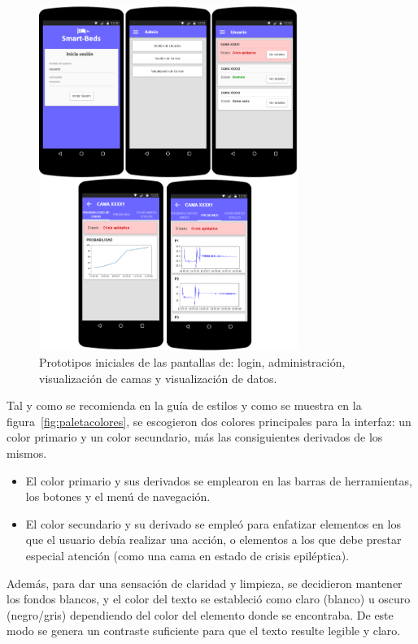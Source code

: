 \begin{figure}[H]
	\centering
	\includegraphics[width=0.75\textwidth]{../img/prototipos.png}
	\caption{Prototipos iniciales de las pantallas de: login, administración, visualización de camas y visualización de datos.}
	\label{fig:prototipos}
\end{figure}

Tal y como se recomienda en la guía de estilos y como se muestra en la figura~\ref{fig:paletacolores}, se escogieron dos colores principales para la interfaz: un color primario y un color secundario, más las consiguientes derivados de los mismos. 
\begin{itemize}
	\item El color primario y sus derivados se emplearon en las barras de herramientas, los botones y el menú de navegación. 
	\item El color secundario y su derivado se empleó para enfatizar elementos en los que el usuario debía realizar una acción, o elementos a los que debe prestar especial atención (como una cama en estado de crisis epiléptica). 
\end{itemize}

Además, para dar una sensación de claridad y limpieza, se decidieron mantener los fondos blancos, y el color del texto se estableció como claro (blanco) u oscuro (negro/gris) dependiendo del color del elemento donde se encontraba. De este modo se genera un contraste suficiente para que el texto resulte legible y claro. 

